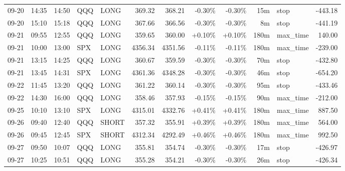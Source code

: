 \documentclass[11pt,a4paper]{article}
\begin{document}
\begin{center}
\begin{longtable}{>{\color{txtmain}}l l l l l r r r r r >{\color{txtmain}}l r}
09-20 & 14:35 & 14:50 & QQQ & LONG & 369.32 & 368.21 & \textcolor{lossred}{-0.30\%} & \textcolor{lossred}{-0.30\%} & 15m & stop & \textcolor{lossred}{-443.18} \\
09-20 & 15:10 & 15:18 & QQQ & LONG & 367.66 & 366.56 & \textcolor{lossred}{-0.30\%} & \textcolor{lossred}{-0.30\%} & 8m & stop & \textcolor{lossred}{-441.19} \\
09-21 & 09:55 & 12:55 & QQQ & LONG & 359.65 & 360.00 & \textcolor{wingreen}{+0.10\%} & \textcolor{wingreen}{+0.10\%} & 180m & max\_time & \textcolor{wingreen}{140.00} \\
09-21 & 10:00 & 13:00 & SPX & LONG & 4356.34 & 4351.56 & \textcolor{lossred}{-0.11\%} & \textcolor{lossred}{-0.11\%} & 180m & max\_time & \textcolor{lossred}{-239.00} \\
09-21 & 13:15 & 14:25 & QQQ & LONG & 360.67 & 359.59 & \textcolor{lossred}{-0.30\%} & \textcolor{lossred}{-0.30\%} & 70m & stop & \textcolor{lossred}{-432.80} \\
09-21 & 13:45 & 14:31 & SPX & LONG & 4361.36 & 4348.28 & \textcolor{lossred}{-0.30\%} & \textcolor{lossred}{-0.30\%} & 46m & stop & \textcolor{lossred}{-654.20} \\
09-22 & 11:45 & 13:20 & QQQ & LONG & 361.22 & 360.14 & \textcolor{lossred}{-0.30\%} & \textcolor{lossred}{-0.30\%} & 95m & stop & \textcolor{lossred}{-433.46} \\
09-22 & 14:30 & 16:00 & QQQ & LONG & 358.46 & 357.93 & \textcolor{lossred}{-0.15\%} & \textcolor{lossred}{-0.15\%} & 90m & max\_time & \textcolor{lossred}{-212.00} \\
09-25 & 10:10 & 13:10 & SPX & LONG & 4315.01 & 4332.76 & \textcolor{wingreen}{+0.41\%} & \textcolor{wingreen}{+0.41\%} & 180m & max\_time & \textcolor{wingreen}{887.50} \\
09-26 & 09:40 & 12:40 & QQQ & SHORT & 357.32 & 355.91 & \textcolor{wingreen}{+0.39\%} & \textcolor{wingreen}{+0.39\%} & 180m & max\_time & \textcolor{wingreen}{564.00} \\
09-26 & 09:45 & 12:45 & SPX & SHORT & 4312.34 & 4292.49 & \textcolor{wingreen}{+0.46\%} & \textcolor{wingreen}{+0.46\%} & 180m & max\_time & \textcolor{wingreen}{992.50} \\
09-27 & 09:50 & 10:07 & QQQ & LONG & 355.81 & 354.74 & \textcolor{lossred}{-0.30\%} & \textcolor{lossred}{-0.30\%} & 17m & stop & \textcolor{lossred}{-426.97} \\
09-27 & 10:25 & 10:51 & QQQ & LONG & 355.28 & 354.21 & \textcolor{lossred}{-0.30\%} & \textcolor{lossred}{-0.30\%} & 26m & stop & \textcolor{lossred}{-426.34} \\

\end{longtable}
\end{center}
\end{document}
